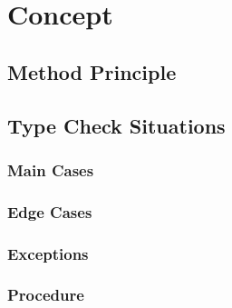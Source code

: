 
\chapter{Concept}
\label{cha:concept}

\section{Method Principle}
\label{sec:method_principle}

\section{Type Check Situations}
\label{sec:type_check_situations}

\subsection{Main Cases}
\label{sec:main_cases}

\subsection{Edge Cases}
\label{sec:edge_cases}

\subsection{Exceptions}
\label{sec:exceptions}

\subsection{Procedure}
\label{sec:procedure}